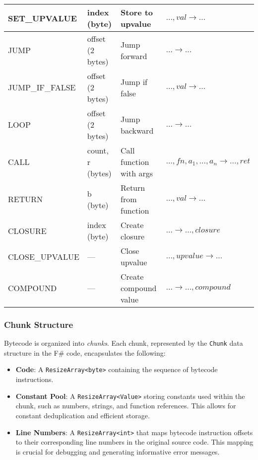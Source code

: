 \begin{table}[h]
\begin{tabularx}{\textwidth}{|X|X|X|X|}
        \hline
        SET\_UPVALUE & index (byte) & Store to upvalue & $\dots, val \rightarrow \dots$ \\
        \hline
        JUMP & offset (2 bytes) & Jump forward & $\dots \rightarrow \dots$ \\
        \hline
        JUMP\_IF\_FALSE & offset (2 bytes) & Jump if false & $\dots, val \rightarrow \dots$ \\
        \hline
        LOOP & offset (2 bytes) & Jump backward & $\dots \rightarrow \dots$ \\
        \hline
        CALL & count, r (bytes) & Call function with args & $\dots, fn, a_1, \dots, a_n \rightarrow \dots, ret$ \\
        \hline
        RETURN & b (byte) & Return from function & $\dots, val \rightarrow \dots$ \\
        \hline
        CLOSURE & index (byte) & Create closure & $\dots \rightarrow \dots, closure$ \\
        \hline
        CLOSE\_UPVALUE & --- & Close upvalue & $\dots, upvalue \rightarrow \dots$ \\
        \hline
        COMPOUND & --- & Create compound value & $\dots \rightarrow \dots, compound$ \\
        \hline
    \end{tabularx}
    \label{tab:instruction-set}
\end{table}

\subsubsection{Chunk Structure}

Bytecode is organized into \textit{chunks}.
Each chunk, represented by the \texttt{Chunk} data structure in the F\# code, encapsulates the following:

\begin{itemize}
    \item \textbf{Code}: A \texttt{ResizeArray<byte>} containing the sequence of bytecode instructions.
    \item \textbf{Constant Pool}: A \texttt{ResizeArray<Value>} storing constants used within the chunk, such as numbers, strings, and function references.
    This allows for constant deduplication and efficient storage.
    \item \textbf{Line Numbers}: A \texttt{ResizeArray<int>} that maps bytecode instruction offsets to their corresponding line numbers in the original source code.
    This mapping is crucial for debugging and generating informative error messages.
\end{itemize}

